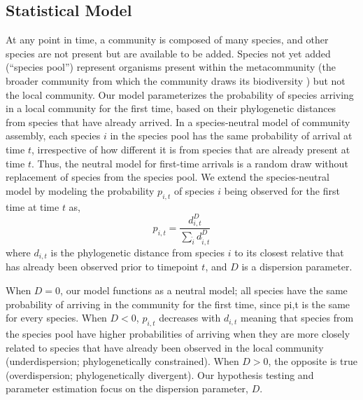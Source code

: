 \documentclass{article}
\begin{document}
\subsection{Statistical Model} \label{sec:statisticalModel}
At any point in time, a community is composed of many species, and other species are not present but are available to be added. Species not yet added (“species pool”) represent organisms present within the metacommunity (the broader community from which the community draws its biodiversity \cite{Nemergut2013}) but not the local community. Our model parameterizes the probability of species arriving in a local community for the first time, based on their phylogenetic distances from species that have already arrived. In a species-neutral model of community assembly, each species \(i\) in the species pool has the same probability of arrival at time \(t\), irrespective of how different it is from species that are already present at time \(t\). Thus, the neutral model for first-time arrivals is a random draw without replacement of species from the species pool. We extend the species-neutral model by modeling the probability \(p_{i,t}\) of species \(i\) being observed for the first time at time \(t\) as,
\begin{equation}
	\label{sec:equation1}
	p_{i,t} = \frac {d_{i,t}^D} { \sum\limits_{\hat{i}} d_{\hat{i},t}^D } 
\end{equation}
where \(d_{i,t}\) is the phylogenetic distance from species \(i\) to its closest relative that has already been observed prior to timepoint \(t\), and \(D\) is a dispersion parameter.
\par
When \(D = 0\), our model functions as a neutral model; all species have the same probability of arriving in the community for the first time, since pi,t is the same for every species. When \(D < 0\), \(p_{i,t}\) decreases with \(d_{i,t}\) meaning that species from the species pool have higher probabilities of arriving when they are more closely related to species that have already been observed in the local community (underdispersion; phylogenetically constrained). When \(D>0\), the opposite is true (overdispersion; phylogenetically divergent). Our hypothesis testing and parameter estimation focus on the dispersion parameter, \(D\).
\end{document}
